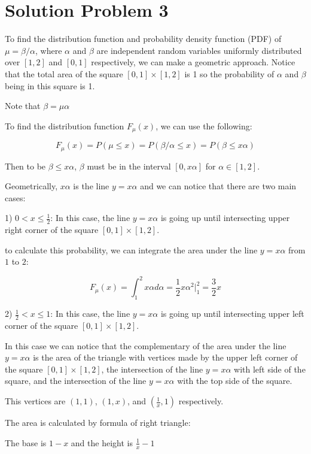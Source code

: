 \section*{Solution Problem 3}

To find the distribution function and probability density function (PDF)
of \(\mu = \beta / \alpha\), where \(\alpha\) and \(\beta\) are independent
random variables uniformly distributed over \([1, 2]\) and \([0, 1]\) respectively,
we can make a geometric approach. Notice that the total area of the square
$[0, 1] \times [1, 2]$ is 1 so the probability of $\alpha$ and $\beta$ being
in this square is 1.

Note that $\beta = \mu \alpha$

To find the distribution function $F_{\mu}(x)$, we can use the following:

\[ F_{\mu}(x) = P(\mu \leq x) = P(\beta / \alpha \leq x) = P(\beta \leq x \alpha) \]

Then to be $\beta \leq x \alpha$, $\beta$ must be in the interval $[0, x \alpha]$
for $\alpha \in [1, 2]$.

Geometrically, $x \alpha$ is the line $y = x \alpha$ and we can notice that
there are two main cases:

1) $0 < x \leq \frac{1}{2}$: In this case, the line $y = x \alpha$ is going up
until intersecting upper right corner of the square $[0, 1] \times [1, 2]$.

to calculate this probability, we can integrate the area under the line
$y = x \alpha$ from $1$ to $2$:

\[ F_{\mu}(x) = \int_{1}^{2} x \alpha d\alpha = \frac{1}{2} x \alpha^2 \Big|_{1}^{2} = \frac{3}{2}x \]

2) $\frac{1}{2} < x \leq 1$: In this case, the line $y = x \alpha$ is going up
until intersecting upper left corner of the square $[0, 1] \times [1, 2]$.

In this case we can notice that the complementary of the area under
the line $y = x \alpha$ is the area of the triangle with vertices made
by the upper left corner of the square $[0, 1] \times [1, 2]$, the intersection
of the line $y = x \alpha$ with left side of the square, and
the intersection of the line $y = x \alpha$ with the top side of the square.

This vertices are $(1, 1)$, $(1, x)$, and $(\frac{1}{x}, 1)$ respectively.

The area is calculated by formula of right triangle:

The base is $1 - x$ and the height is $\frac{1}{x} - 1$

